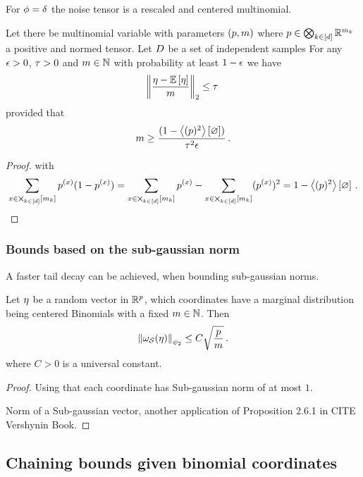 For $\phi=\delta$ the noise tensor is a rescaled and centered multinomial.

\begin{corollary}
	Let there be multinomial variable with parameters $(p,m)$ where $p\in\bigotimes_{k\in[d]} \mathbb{R}^{m_{k}}$ a positive and normed tensor.
	Let $D$ be a set of independent samples
	For any $\epsilon>0$, $\tau>0$ and $m\in\mathbb{N}$ with probability at least $1-\epsilon$ we have
		\[ \left\|\frac{\eta-\mathbb{E}\left[\eta\right]}{m}\right\|_{2} \leq   \tau \, \]
	provided that
		\[ m \geq  \frac{(1-\left\langle (p)^2\right\rangle \left[ \varnothing \right])}{\tau^2 \epsilon} \, . \]
\end{corollary}
\begin{proof}
	 with
		\[ \sum_{x\in\bigtimes_{k\in[d]}[m_{k}]} p^{(x)}(1-p^{(x)}) = \sum_{x\in\bigtimes_{k\in[d]}[m_{k}]} p^{(x)} - \sum_{x\in\bigtimes_{k\in[d]}[m_{k}]} (p^{(x)})^2 = 1-\left\langle (p)^2\right\rangle \left[ \varnothing \right] \, . \]
\end{proof}



\subsubsection{Bounds based on the sub-gaussian norm}


A faster tail decay can be achieved, when bounding sub-gaussian norms.


\begin{theorem}
	Let $\eta$ be a random vector in $\mathbb{R}^p$, which coordinates have a marginal distribution being centered Binomials with a fixed $m\in\mathbb{N}$.
	Then
		\[ \left\|\omega_{\mathcal{S}}(\eta)\right\|_{\psi_2} \leq C \sqrt{\frac{p}{m}} \, . \]
	where $C>0$ is a universal constant.
\end{theorem}
\begin{proof}
	Using that each coordinate has Sub-gaussian norm of at most $1$.

	
	Norm of a Sub-gaussian vector, another application of Proposition 2.6.1 in CITE Vershynin Book.
\end{proof}




\subsection{Chaining bounds given binomial coordinates}


